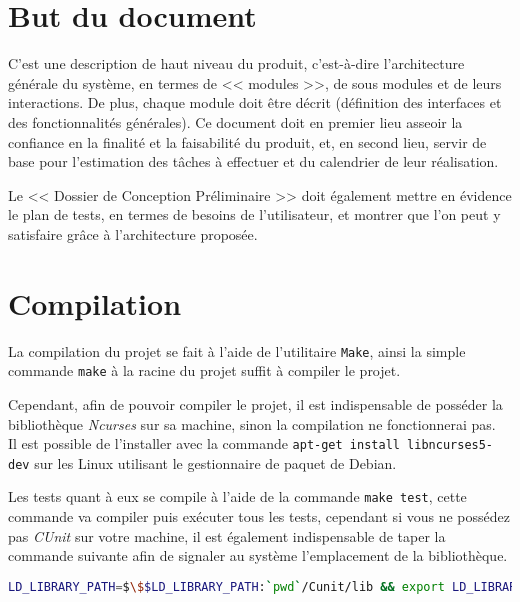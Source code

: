 \documentclass[12pt,a4paper,openany]{book}
\begin{document}
	\setcounter{tocdepth}{2}
	\setcounter{secnumdepth}{3}
	\maketitle
	\tableofcontents
	\newpage
	\section{But du document} %
	C'est une description de haut niveau du produit, c'est-à-dire l'architecture générale du système, en termes de << modules >>, de sous modules et de leurs
	interactions. De plus, chaque module doit être décrit (définition des interfaces et des fonctionnalités générales). Ce document doit en premier lieu asseoir
	la confiance en la finalité et la faisabilité du produit, et, en second lieu, servir de base pour l'estimation des tâches à effectuer et du calendrier de
	leur réalisation.

	Le << Dossier de Conception Préliminaire >> doit également mettre en évidence le plan de tests, en termes de besoins de l'utilisateur, et montrer que l'on peut
	y satisfaire grâce à l'architecture proposée.
	\section{Compilation}
	La compilation du projet se fait à l'aide de l'utilitaire \texttt{Make}, ainsi la simple
	commande \texttt{make} à la racine du projet suffit à compiler le projet.

	Cependant, afin de pouvoir compiler le projet, il est indispensable de posséder la
	bibliothèque \textit{Ncurses} sur sa machine, sinon la compilation ne fonctionnerai pas.\\ 
	Il est possible de l'installer avec la commande \texttt{apt-get install libncurses5-dev}
	sur les Linux utilisant le gestionnaire de paquet de Debian.

	Les tests quant à eux se compile à l'aide de la commande \texttt{make test}, cette
	commande va compiler puis exécuter tous les tests, cependant si vous ne possédez pas
	\textit{CUnit} sur votre machine, il est également indispensable de taper la commande
	suivante afin de signaler au système l'emplacement de la bibliothèque.

	\begin{lstlisting}[language=sh,numbers=none]
LD_LIBRARY_PATH=$\$$LD_LIBRARY_PATH:`pwd`/Cunit/lib && export LD_LIBRARY_PATH		
	\end{lstlisting}
\end{document}
